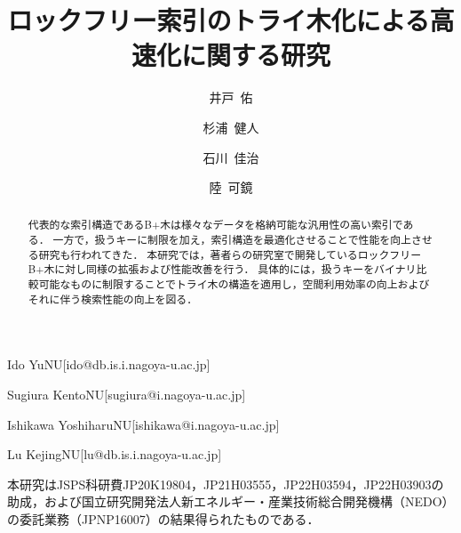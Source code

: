 \documentclass[
  submit,
  techrep,
  noauthor,
  a4paper,
  notitlepage,
  ja=standard,
  autodetect-engine,
  dvi=dvipdfmx
]{ipsj}
\begin{document}
\title{ロックフリー索引のトライ木化による高速化に関する研究}


\author{井戸~佑}{Ido Yu}{NU}[ido@db.is.i.nagoya-u.ac.jp]
\author{杉浦~健人}{Sugiura Kento}{NU}[sugiura@i.nagoya-u.ac.jp]
\author{石川~佳治}{Ishikawa Yoshiharu}{NU}[ishikawa@i.nagoya-u.ac.jp]
\author{陸~可鏡}{Lu Kejing}{NU}[lu@db.is.i.nagoya-u.ac.jp]

\begin{abstract}
  代表的な索引構造であるB+木は様々なデータを格納可能な汎用性の高い索引である．
  一方で，扱うキーに制限を加え，索引構造を最適化させることで性能を向上させる研究も行われてきた．
  本研究では，著者らの研究室で開発しているロックフリーB+木に対し同様の拡張および性能改善を行う．
  具体的には，扱うキーをバイナリ比較可能なものに制限することでトライ木の構造を適用し，空間利用効率の向上およびそれに伴う検索性能の向上を図る．
\end{abstract}

\maketitle



\begin{acknowledgment}
  本研究はJSPS科研費JP20K19804，JP21H03555，JP22H03594，JP22H03903の助成，および国立研究開発法人新エネルギー・産業技術総合開発機構（NEDO）の委託業務（JPNP16007）の結果得られたものである．
\end{acknowledgment}



\end{document}
